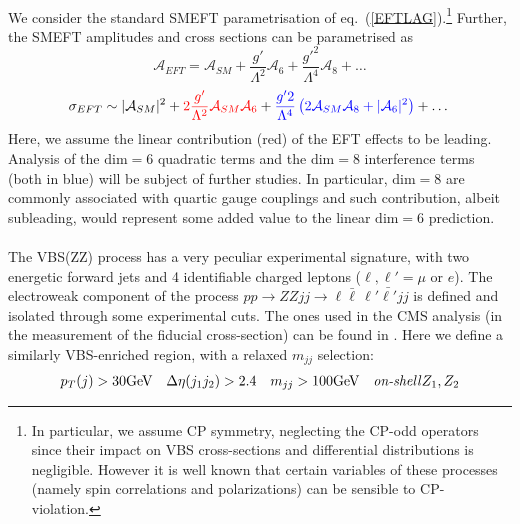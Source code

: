 \\
%
We consider the standard SMEFT parametrisation of eq.~(\ref{EFTLAG}).\footnote{In particular, we assume CP symmetry, neglecting the CP-odd operators since their impact on VBS cross-sections and differential distributions is negligible. However it is well known that certain variables of these processes (namely spin correlations and polarizations) can be sensible to CP-violation.} Further, the SMEFT amplitudes and cross sections can be parametrised as
%
\begin{equation}
\mathcal{A}_{EFT} = \mathcal{A}_{SM} + \frac{g'}{\Lambda^2} \mathcal{A}_{6} +   \frac{g'^2}{\Lambda^4} \mathcal{A}_{8} + \dots 
\end{equation}
%
\begin{equation}
 \sigma_{EFT} \sim \vert \mathcal{A}_{SM} \vert^2 + {\color{red} 2\frac{g'}{\Lambda^2} \mathcal{A}_{SM} \mathcal{A}_{6} } + {\color{blue} \frac{g'2}{\Lambda^4} \left(  2 \mathcal{A}_{SM} \mathcal{A}_{8} + \vert \mathcal{A}_{6} \vert^2 \right)} + \dots
\end{equation}
%
Here, we assume the linear contribution (red) of the EFT effects to be leading. Analysis of the $\mathrm{dim=6}$ quadratic terms and the $\mathrm{dim=8}$ interference terms (both in blue) will be subject of further studies.  In particular, $\mathrm{dim=8}$ are commonly associated with quartic gauge couplings and such contribution, albeit subleading, would represent some added value to the linear $\mathrm{dim=6}$ prediction. \\
 
\\
The VBS(ZZ) process has a very peculiar experimental signature, with two energetic forward jets and 4 identifiable charged leptons ($\ell, \ell' = \mu$ or $e$).
The electroweak component of the process $p p \to Z Z j j \to \ell \bar{\ell} \, \ell' \bar{\ell'} j j$ is defined and isolated through some experimental cuts. The ones used in the CMS analysis (in the measurement of the fiducial cross-section) can be found in \cite{Sirunyan:2017fvv}. Here we define a similarly VBS-enriched region, with a relaxed $m_{jj}$ selection: %
%
\begin{eqnarray}
p_T (j) > 30 \textrm{GeV} \quad \Delta \eta (j_1 j_2) > 2.4\quad m_{jj} > 100 \textrm{GeV}\quad \textrm{\emph{on-shell}}Z_1,Z_2
\end{eqnarray}
%


